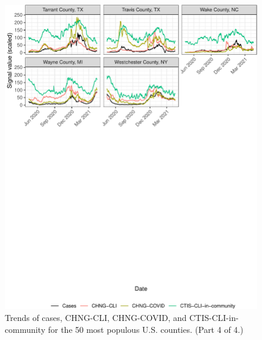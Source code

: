\documentclass[9pt,twoside,lineno]{pnas-new}
\begin{document}
\begin{figure}

{\centering \includegraphics[width=\textwidth]{fig/county-trend-grids-4-1} 

}

\caption{Trends of cases, CHNG-CLI, CHNG-COVID, and CTIS-CLI-in-community for the 50 most populous U.S. counties. (Part 4 of 4.)}\label{fig:county-trend-grids-4}
\end{figure}

\clearpage
\end{document}
